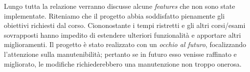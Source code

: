 Lungo tutta la relazione verranno discusse alcune \textit{features} che non sono state implementate. Riteniamo che il progetto abbia soddisfatto pienamente gli obiettivi richiesti dal corso. Ciononostante i tempi ristretti e gli altri corsi/esami sovrapposti hanno impedito di estendere ulteriori funzionalità e apportare altri miglioramenti. Il progetto è stato realizzato con un \textit{occhio al futuro}, focalizzando l'attenzione sulla manutenibilità; pertanto se in futuro esso venisse raffinato e migliorato, le modifiche richiederebbero una manutenzione non troppo onerosa.